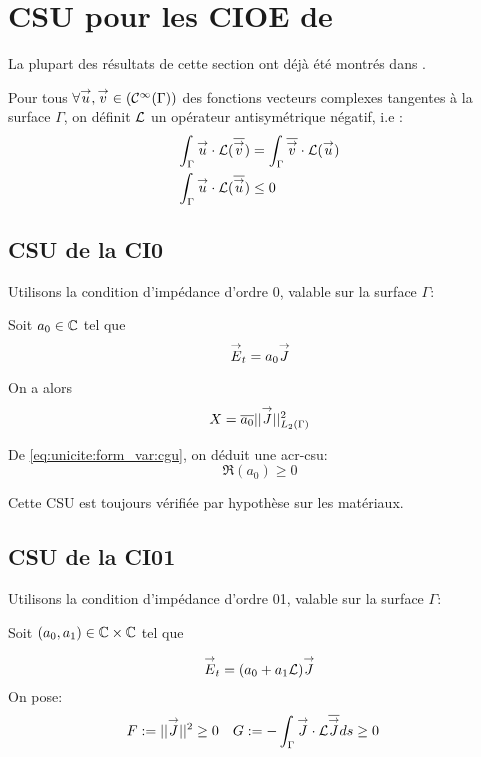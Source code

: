 \section{CSU pour les CIOE de \cite{stupfel_sufficient_2011}}
  La plupart des résultats de cette section ont déjà été montrés dans \cite{stupfel_sufficient_2011}.


  Pour tous \(\forall {\overset{\rightarrow}{u}}, {\overset{\rightarrow}{v}} \in (\mathcal C^\infty(\Gamma))\) des fonctions vecteurs complexes tangentes à la surface \(\Gamma\), on définit \(\mathcal{L}\) un opérateur antisymétrique négatif, i.e :
  \begin{align*}
    \int_\Gamma {\overset{\rightarrow}{u}}\cdot \mathcal{L}({\overline{{\overset{\rightarrow}{v}}}}) &= \int_\Gamma {\overline{{\overset{\rightarrow}{v}}}}\cdot \mathcal{L}({\overset{\rightarrow}{u}})\\
    \int_\Gamma {\overset{\rightarrow}{u}}\cdot \mathcal{L}({\overline{{\overset{\rightarrow}{u}}}}) &\le 0
  \end{align*}

  \subsection{CSU de la CI0}
    Utilisons la condition d’impédance d'ordre 0, valable sur la surface \(\Gamma\):

    Soit \(a_0 \in \mathbb C\) tel que
    \[
      {\overset{\rightarrow}{E}}_t = a_0 {\overset{\rightarrow}{J}}
    \]

    On a alors
    \begin{equation*}
    X = {\overline{a_0}}||{\overset{\rightarrow}{J}}||_{L_2(\Gamma)}^2
    \end{equation*}

    De \eqref{eq:unicite:form_var:cgu}, on déduit une \gls{acr-csu}:
    \begin{equation}
    \Re\left(a_0\right) \ge 0
    \end{equation}

    Cette CSU est toujours vérifiée par hypothèse sur les matériaux.

  \subsection{CSU de la CI01}
    Utilisons la condition d’impédance d'ordre 01, valable sur la surface \(\Gamma\):

    Soit \((a_0, a_1) \in \mathbb C\times\mathbb C\) tel que

    \[
      {\overset{\rightarrow}{E}}_t = (a_0 +a_1 \mathcal{L}){\overset{\rightarrow}{J}}
    \]
    On pose:
    \begin{align*}
      F&:= || {\overset{\rightarrow}{J}}|| ^2 \ge 0  & G&:= -\int_\Gamma {\overset{\rightarrow}{J}}\cdot \mathcal{L}{\overline{{\overset{\rightarrow}{J}}}} ds \ge 0
    \end{align*}

